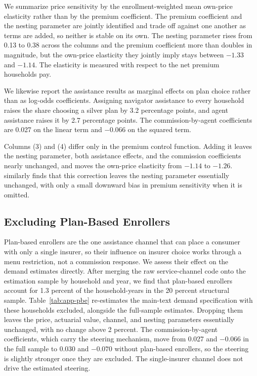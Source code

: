 \documentclass[12pt]{article}
\begin{document}
We summarize price sensitivity by the enrollment-weighted mean own-price elasticity rather than by the premium coefficient. The premium coefficient and the nesting parameter are jointly identified and trade off against one another as terms are added, so neither is stable on its own. The nesting parameter rises from 0.13 to 0.38 across the columns and the premium coefficient more than doubles in magnitude, but the own-price elasticity they jointly imply stays between $-1.33$ and $-1.14$. The elasticity is measured with respect to the net premium households pay.

We likewise report the assistance results as marginal effects on plan choice rather than as log-odds coefficients. Assigning navigator assistance to every household raises the share choosing a silver plan by 3.2 percentage points, and agent assistance raises it by 2.7 percentage points. The commission-by-agent coefficients are 0.027 on the linear term and $-0.066$ on the squared term.

Columns (3) and (4) differ only in the premium control function. Adding it leaves the nesting parameter, both assistance effects, and the commission coefficients nearly unchanged, and moves the own-price elasticity from $-1.14$ to $-1.26$. \citet{saltzman2019} similarly finds that this correction leaves the nesting parameter essentially unchanged, with only a small downward bias in premium sensitivity when it is omitted.

\subsection{Excluding Plan-Based Enrollers}
\label{app:pbe}

Plan-based enrollers are the one assistance channel that can place a consumer with only a single insurer, so their influence on insurer choice works through a menu restriction, not a commission response. We assess their effect on the demand estimates directly. After merging the raw service-channel code onto the estimation sample by household and year, we find that plan-based enrollers account for 1.3 percent of the household-years in the 20 percent structural sample. Table~\ref{tab:app-pbe} re-estimates the main-text demand specification with these households excluded, alongside the full-sample estimates. Dropping them leaves the price, actuarial value, channel, and nesting parameters essentially unchanged, with no change above 2 percent. The commission-by-agent coefficients, which carry the steering mechanism, move from 0.027 and $-0.066$ in the full sample to 0.030 and $-0.070$ without plan-based enrollers, so the steering is slightly stronger once they are excluded. The single-insurer channel does not drive the estimated steering.
\end{document}
